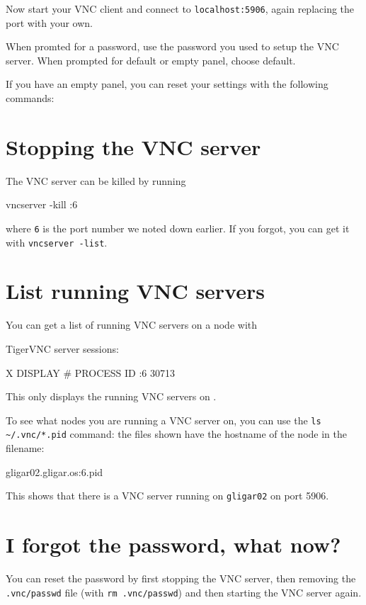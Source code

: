 Now start your VNC client and connect to \lstinline|localhost:5906|, again replacing
the port with your own.

When promted for a password, use the password you used to setup the VNC server.
When prompted for default or empty panel, choose default.

If you have an empty panel, you can reset your settings with the following commands:

\begin{prompt}
\end{prompt}

\section{Stopping the VNC server}

The VNC server can be killed by running

\begin{prompt}
vncserver -kill :6
\end{prompt}

where \lstinline|6| is the port number we noted down earlier. If you forgot,
you can get it with \lstinline|vncserver -list|.

\section{List running VNC servers}

You can get a list of running VNC servers on a node with

\begin{prompt}
TigerVNC server sessions:

X DISPLAY #	PROCESS ID
:6		    30713
\end{prompt}

This only displays the running VNC servers on .

To see what nodes you are running a VNC server on, you can use the \lstinline|ls ~/.vnc/*.pid|
command: the files shown have the hostname of the node in the filename:

\begin{prompt}
gligar02.gligar.os:6.pid
\end{prompt}

This shows that there is a VNC server running on \lstinline|gligar02| on port 5906.

\section{I forgot the password, what now?}

You can reset the password by first stopping the VNC server, then removing
the \lstinline|.vnc/passwd| file (with \lstinline|rm .vnc/passwd|) and then
starting the VNC server again.
